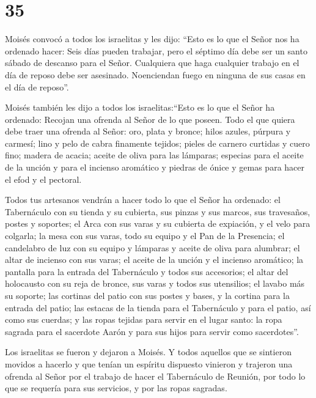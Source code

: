 \hypertarget{section-34}{%
\section{35}\label{section-34}}

 Moisés convocó a todos los israelitas y les dijo: ``Esto es
lo que el Señor nos ha ordenado hacer:  Seis días pueden
trabajar, pero el séptimo día debe ser un santo sábado de descanso para
el Señor. Cualquiera que haga cualquier trabajo en el día de reposo debe
ser asesinado.  Noenciendan fuego en ninguna de sus casas en
el día de reposo''.

 Moisés también les dijo a todos los israelitas:``Esto es lo
que el Señor ha ordenado:  Recojan una ofrenda al Señor de
lo que poseen. Todo el que quiera debe traer una ofrenda al Señor: oro,
plata y bronce;  hilos azules, púrpura y carmesí; lino y
pelo de cabra finamente tejidos;  pieles de carnero curtidas
y cuero fino; madera de acacia;  aceite de oliva para las
lámparas; especias para el aceite de la unción y para el incienso
aromático  y piedras de ónice y gemas para hacer el efod y
el pectoral.

 Todos tus artesanos vendrán a hacer todo lo que el Señor
ha ordenado:  el Tabernáculo con su tienda y su cubierta,
sus pinzas y sus marcos, sus travesaños, postes y soportes;
 el Arca con sus varas y su cubierta de expiación, y el
velo para colgarla;  la mesa con sus varas, todo su equipo
y el Pan de la Presencia;  el candelabro de luz con su
equipo y lámparas y aceite de oliva para alumbrar;  el
altar de incienso con sus varas; el aceite de la unción y el incienso
aromático; la pantalla para la entrada del Tabernáculo y todos sus
accesorios;  el altar del holocausto con su reja de bronce,
sus varas y todos sus utensilios; el lavabo más su soporte;
 las cortinas del patio con sus postes y bases, y la
cortina para la entrada del patio;  las estacas de la
tienda para el Tabernáculo y para el patio, así como sus cuerdas;
 y las ropas tejidas para servir en el lugar santo: la ropa
sagrada para el sacerdote Aarón y para sus hijos para servir como
sacerdotes''.

 Los israelitas se fueron y dejaron a Moisés. 
Y todos aquellos que se sintieron movidos a hacerlo y que tenían un
espíritu dispuesto vinieron y trajeron una ofrenda al Señor por el
trabajo de hacer el Tabernáculo de Reunión, por todo lo que se requería
para sus servicios, y por las ropas sagradas.

